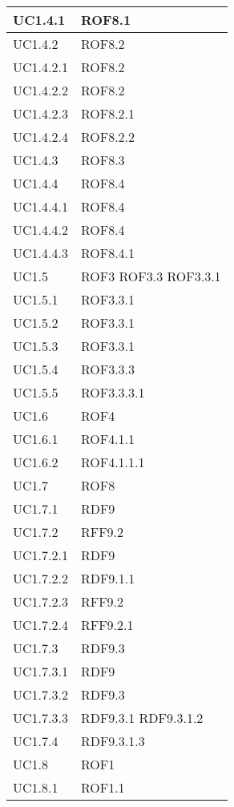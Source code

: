 \begin{center}
\begin{longtable}{| p{4cm} | p{4cm} |}
	\hline
	UC1.4.1  &  ROF8.1 \\
	\hline
	UC1.4.2  &  ROF8.2 \\
	\hline
	UC1.4.2.1  &  ROF8.2 \\
	\hline
	UC1.4.2.2  &  ROF8.2 \\
	\hline
	UC1.4.2.3  &  ROF8.2.1 \\
	\hline
	UC1.4.2.4  &  ROF8.2.2 \\
	\hline
	UC1.4.3  &  ROF8.3 \\
	\hline
	UC1.4.4  &  ROF8.4 \\
	\hline
	UC1.4.4.1  &  ROF8.4 \\
	\hline
	UC1.4.4.2  &  ROF8.4 \\
	\hline
	UC1.4.4.3  &  ROF8.4.1 \\
	\hline
	UC1.5  &  ROF3 \newline ROF3.3 \newline ROF3.3.1 \\
	\hline
	UC1.5.1  &  ROF3.3.1 \\
	\hline
	UC1.5.2  &  ROF3.3.1 \\
	\hline
	UC1.5.3  &  ROF3.3.1 \\
	\hline
	UC1.5.4  &  ROF3.3.3 \\
	\hline
	UC1.5.5  &  ROF3.3.3.1 \\
	\hline
	UC1.6  &  ROF4 \\
	\hline
	UC1.6.1  &  ROF4.1.1 \\
	\hline
	UC1.6.2  &  ROF4.1.1.1 \\
	\hline
	UC1.7  &  ROF8 \\
	\hline
	UC1.7.1  &  RDF9 \\
	\hline
	UC1.7.2  &  RFF9.2 \\
	\hline
	UC1.7.2.1  &  RDF9 \\
	\hline
	UC1.7.2.2  &  RDF9.1.1 \\
	\hline
	UC1.7.2.3  &  RFF9.2 \\
	\hline
	UC1.7.2.4  &  RFF9.2.1 \\
	\hline
	UC1.7.3  &  RDF9.3 \\
	\hline
	UC1.7.3.1  &  RDF9 \\
	\hline
	UC1.7.3.2  &  RDF9.3 \\
	\hline
	UC1.7.3.3  &  RDF9.3.1 \newline RDF9.3.1.2 \\
	\hline
	UC1.7.4  &  RDF9.3.1.3 \\
	\hline
	UC1.8  &  ROF1 \\
	\hline
	UC1.8.1  &  ROF1.1 \\

\end{longtable}
\end{center}
